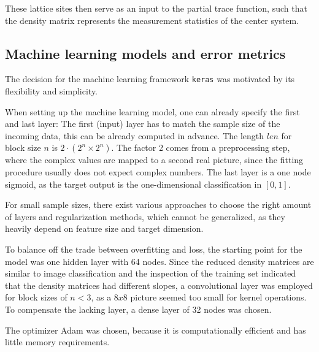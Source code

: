 \documentclass[reprint,amsmath,amssymb,aps,prb]{revtex4-2}
\begin{document}
These lattice sites then serve as an input to the partial trace function, such that the density matrix represents the measurement statistics of the center system.

\subsection{Machine learning models and error metrics}\label{sec:nn}

The decision for the machine learning framework \texttt{keras} was motivated by its flexibility and simplicity.\cite{chollet2015keras}

When setting up the machine learning model, one can already specify the first and last layer: The first (input) layer has to match the sample size of the incoming data, this can be already computed in advance. The length $len$ for block size $n$ is $2\cdot\left(2^n\times 2^n \right)$. The factor 2 comes from a preprocessing step, where the complex values are mapped to a second real picture, since the fitting procedure usually does not expect complex numbers. The last layer is a one node sigmoid, as the target output is the one-dimensional classification in $\left[0,1\right]$.

For small sample sizes, there exist various approaches to choose the right amount of layers and regularization methods, which cannot be generalized, as they heavily depend on feature size and target dimension.\cite{Olson2018,Feng2019}

To balance off the trade between overfitting and loss, the starting point for the model was one hidden layer with 64 nodes. Since the reduced density matrices are similar to image classification and the inspection of the training set indicated that the density matrices had different slopes, a convolutional layer was employed for block sizes of $n<3$, as a $8x8$ picture seemed too small for kernel operations. To compensate the lacking layer, a dense layer of 32 nodes was chosen.

The optimizer Adam was chosen, because it is computationally efficient and
has little memory requirements. \cite{Kingma2014}
\end{document}
